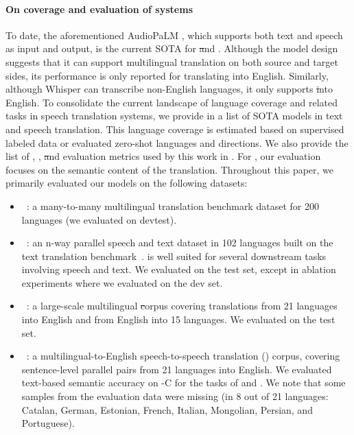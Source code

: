 \paragraph{On coverage and evaluation of \sst systems}\label{sec:statement:evaluation}
To date, the aforementioned AudioPaLM \citep{Rubenstein2023AudioPaLMAL}, which supports both text and speech as input and output, is the current SOTA for \st and \sst. 
Although the model design suggests that it can support multilingual translation on both source and target sides, its performance is only reported for translating into English. 
Similarly, although Whisper can transcribe non-English languages, it only supports \st into English. 
To consolidate the current landscape of language coverage and related tasks in speech translation systems, we provide in  a list of SOTA models in text and speech translation. This language coverage
is estimated based on supervised labeled data or evaluated zero-shot languages and directions. We also provide the list of \asr, \mt, \st and \sst evaluation metrics used by this work in . For \sst, our evaluation focuses on the semantic content of the translation.
Throughout this paper, we primarily evaluated our models on the following datasets:
\begin{itemize}
    \item {}~\citep{nllb2022}: a many-to-many multilingual translation benchmark dataset for 200 languages (we evaluated on devtest).
    \item \fleurs~\citep{fleurs2022arxiv}: an n-way parallel speech and text dataset in 102 languages built on the text translation  benchmark~\citep{flores101:2021}. \fleurs is well suited for several downstream tasks involving speech and text.
    We evaluated on the test set, except in ablation experiments where we evaluated on the dev set.
    \item \covost~\citep{wang2021covost}: a large-scale multilingual \st corpus covering translations from 21 languages into English and from English into 15 languages. We evaluated on the test set.
    \item \cvss~\citep{cvss}: a multilingual-to-English speech-to-speech translation (\sst) corpus, covering sentence-level parallel \sst pairs from 21 languages into English. We evaluated text-based semantic accuracy on \cvss-C for the tasks of \sst and \ttst. We note that some samples from the evaluation data were missing (in 8 out of 21 languages: Catalan, German, Estonian, French, Italian, Mongolian, Persian, and Portuguese). 
\end{itemize}

